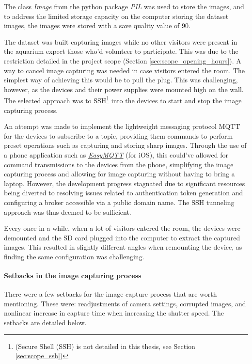 The class \textit{Image} from the python package \textit{PIL} was used to store the images, and to address the limited storage capacity on the computer storing the dataset images, the images were stored with a save quality value of 90.

The dataset was built capturing images while no other visitors were present in the aquarium expect those who'd volunteer to participate. This was due to the restriction detailed in the project scope (Section \ref{sec:scope_opening_hours}). A way to cancel image capturing was needed in case visitors entered the room. The simplest way of achieving this would be to pull the plug. This was challenging, however, as the devices and their power supplies were mounted high on the wall. The selected approach was to SSH\footnote{(Secure Shell (SSH) is not detailed in this thesis, see Section \ref{sec:scope_ssh})} into the devices to start and stop the image capturing process. 

An attempt was made to implement the lightweight messaging protocol MQTT for the devices to subscribe to a topic, providing them commands to perform preset operations such as capturing and storing sharp images. Through the use of a phone application such as \href{https://www.easymqtt.app/}{\textit{EasyMQTT}} (for iOS), this could've allowed for command transmissions to the devices from the phone, simplifying the image capturing process and allowing for image capturing without having to bring a laptop. However, the development progress stagnated due to significant resources being diverted to resolving issues related to authentication token generation and configuring a broker accessible via a public domain name. The SSH tunneling approach was thus deemed to be sufficient.

Every once in a while, when a lot of visitors entered the room, the devices were demounted and the SD card plugged into the computer to extract the captured images. This resulted in slightly different angles when remounting the device, as finding the same configuration was challenging.

\paragraph{Setbacks in the image capturing process}
\label{sec:challenges_in_image_capturing}
There were a few setbacks for the image capture process that are worth mentioning. These were: readjustments of camera settings, corrupted images, and nonlinear increase in capture time when increasing the shutter speed. The setbacks are detailed below.


